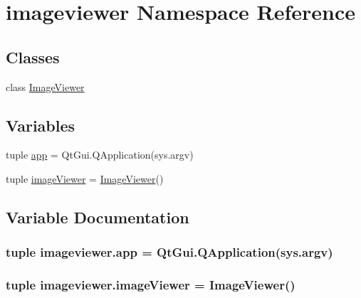 \hypertarget{namespaceimageviewer}{}\section{imageviewer Namespace Reference}
\label{namespaceimageviewer}
\subsection*{Classes}
\begin{DoxyCompactItemize}
\item 
class \hyperlink{classimageviewer_1_1ImageViewer}{Image\+Viewer}
\end{DoxyCompactItemize}
\subsection*{Variables}
\begin{DoxyCompactItemize}
\item 
tuple \hyperlink{namespaceimageviewer_a0ba158ca0bcc0bc37f4e5597b0987e56}{app} = Qt\+Gui.\+Q\+Application(sys.\+argv)
\item 
tuple \hyperlink{namespaceimageviewer_a3fe4cad515f498ebcff31caff639ed49}{image\+Viewer} = \hyperlink{classimageviewer_1_1ImageViewer}{Image\+Viewer}()
\end{DoxyCompactItemize}


\subsection{Variable Documentation}
\hypertarget{namespaceimageviewer_a0ba158ca0bcc0bc37f4e5597b0987e56}{}
\subsubsection[{app}]{\setlength{\rightskip}{0pt plus 5cm}tuple imageviewer.\+app = Qt\+Gui.\+Q\+Application(sys.\+argv)}\label{namespaceimageviewer_a0ba158ca0bcc0bc37f4e5597b0987e56}
\hypertarget{namespaceimageviewer_a3fe4cad515f498ebcff31caff639ed49}{}
\subsubsection[{image\+Viewer}]{\setlength{\rightskip}{0pt plus 5cm}tuple imageviewer.\+image\+Viewer = {\bf Image\+Viewer}()}\label{namespaceimageviewer_a3fe4cad515f498ebcff31caff639ed49}
